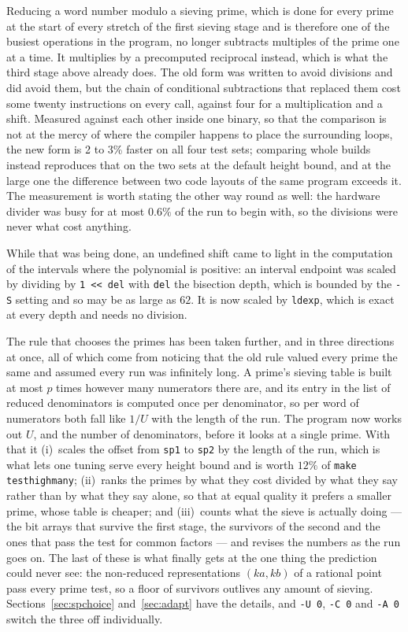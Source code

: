 \documentclass[12pt,a4paper,oneside]{amsart}
\begin{document}
Reducing a word number modulo a sieving prime, which is done for every prime
at the start of every stretch of the first sieving stage and is therefore one
of the busiest operations in the program, no longer subtracts multiples of the
prime one at a time. It multiplies by a precomputed reciprocal instead, which
is what the third stage above already does. The old form was written to avoid
divisions and did avoid them, but the chain of conditional subtractions that
replaced them cost some twenty instructions on every call, against four for a
multiplication and a shift. Measured against each other inside one binary,
so that the comparison is not at the mercy of where the compiler happens to
place the surrounding loops, the new form is 2 to 3\% faster on all four test
sets; comparing whole builds instead reproduces that on the two sets at the
default height bound, and at the large one the difference between two code
layouts of the same program exceeds it. The measurement is worth stating the
other way round as well: the hardware divider was busy for at most $0.6\%$ of
the run to begin with, so the divisions were never what cost anything.

While that was being done, an undefined shift came to light in the
computation of the intervals where the polynomial is positive: an interval
endpoint was scaled by dividing by \verb+1 << del+ with \texttt{del} the
bisection depth, which is bounded by the \verb+-S+ setting and so may be as
large as $62$. It is now scaled by \texttt{ldexp}, which is exact at every
depth and needs no division.

The rule that chooses the primes has been taken further, and in three
directions at once, all of which come from noticing that the old rule valued
every prime the same and assumed every run was infinitely long. A prime's
sieving table is built at most $p$ times however many numerators there are,
and its entry in the list of reduced denominators is computed once per
denominator, so per word of numerators both fall like $1/U$ with the length
of the run. The program now works out $U$, and the number of denominators,
before it looks at a single prime. With that it (i)~scales the offset from
\texttt{sp1} to \texttt{sp2} by the length of the run, which is what lets one
tuning serve every height bound and is worth $12\%$ of \texttt{make
testhighmany}; (ii)~ranks the primes by what they cost divided by what they
say rather than by what they say alone, so that at equal quality it prefers
a smaller prime, whose table is cheaper; and (iii)~counts what the sieve is
actually doing --- the bit arrays that survive the first stage, the survivors
of the second and the ones that pass the test for common factors --- and
revises the numbers as the run goes on. The last of these is what finally
gets at the one thing the prediction could never see: the non-reduced
representations $(ka, kb)$ of a rational point pass every prime test, so a
floor of survivors outlives any amount of sieving. Sections~\ref{sec:spchoice}
and~\ref{sec:adapt} have the details, and \verb+-U 0+, \verb+-C 0+ and
\verb+-A 0+ switch the three off individually.
\end{document}
